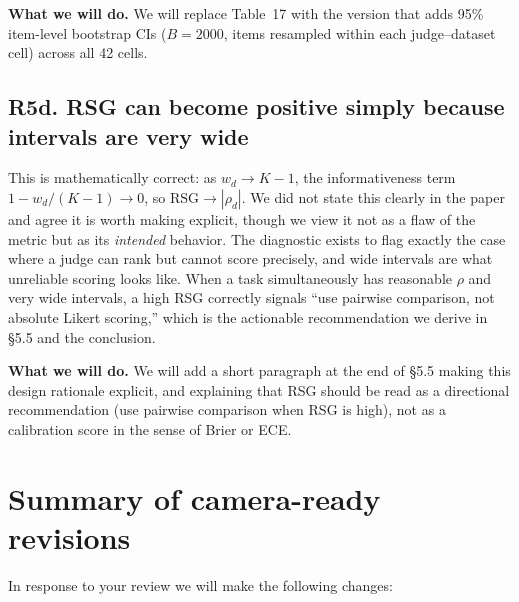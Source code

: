\documentclass[11pt]{article}
\begin{document}
\textbf{What we will do.} We will replace Table~17 with the version that adds 95\% item-level bootstrap CIs ($B = 2000$, items resampled within each judge--dataset cell) across all 42 cells.

\subsection*{R5d. RSG can become positive simply because intervals are very wide}

This is mathematically correct: as $w_d \to K - 1$, the informativeness term $1 - w_d/(K-1) \to 0$, so $\text{RSG} \to |\rho_d|$. We did not state this clearly in the paper and agree it is worth making explicit, though we view it not as a flaw of the metric but as its \emph{intended} behavior. The diagnostic exists to flag exactly the case where a judge can rank but cannot score precisely, and wide intervals are what unreliable scoring looks like. When a task simultaneously has reasonable $\rho$ and very wide intervals, a high RSG correctly signals ``use pairwise comparison, not absolute Likert scoring,'' which is the actionable recommendation we derive in \S 5.5 and the conclusion.

\textbf{What we will do.} We will add a short paragraph at the end of \S 5.5 making this design rationale explicit, and explaining that RSG should be read as a directional recommendation (use pairwise comparison when RSG is high), not as a calibration score in the sense of Brier or ECE.

\section*{Summary of camera-ready revisions}

In response to your review we will make the following changes:
\end{document}
